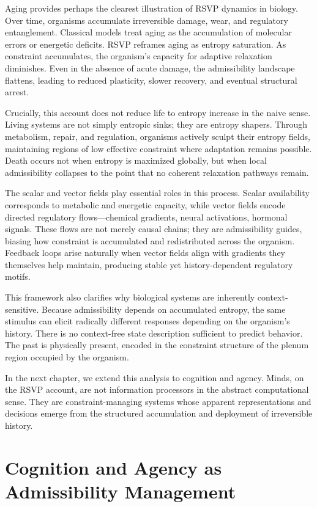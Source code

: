 \documentclass[11pt,oneside]{book}
\begin{document}
Aging provides perhaps the clearest illustration of RSVP dynamics in biology. Over time, organisms accumulate irreversible damage, wear, and regulatory entanglement. Classical models treat aging as the accumulation of molecular errors or energetic deficits. RSVP reframes aging as entropy saturation. As constraint accumulates, the organism’s capacity for adaptive relaxation diminishes. Even in the absence of acute damage, the admissibility landscape flattens, leading to reduced plasticity, slower recovery, and eventual structural arrest.

Crucially, this account does not reduce life to entropy increase in the naive sense. Living systems are not simply entropic sinks; they are entropy shapers. Through metabolism, repair, and regulation, organisms actively sculpt their entropy fields, maintaining regions of low effective constraint where adaptation remains possible. Death occurs not when entropy is maximized globally, but when local admissibility collapses to the point that no coherent relaxation pathways remain.

The scalar and vector fields play essential roles in this process. Scalar availability corresponds to metabolic and energetic capacity, while vector fields encode directed regulatory flows—chemical gradients, neural activations, hormonal signals. These flows are not merely causal chains; they are admissibility guides, biasing how constraint is accumulated and redistributed across the organism. Feedback loops arise naturally when vector fields align with gradients they themselves help maintain, producing stable yet history-dependent regulatory motifs.

This framework also clarifies why biological systems are inherently context-sensitive. Because admissibility depends on accumulated entropy, the same stimulus can elicit radically different responses depending on the organism’s history. There is no context-free state description sufficient to predict behavior. The past is physically present, encoded in the constraint structure of the plenum region occupied by the organism.

In the next chapter, we extend this analysis to cognition and agency. Minds, on the RSVP account, are not information processors in the abstract computational sense. They are constraint-managing systems whose apparent representations and decisions emerge from the structured accumulation and deployment of irreversible history.

\chapter{Cognition and Agency as Admissibility Management}
\end{document}

